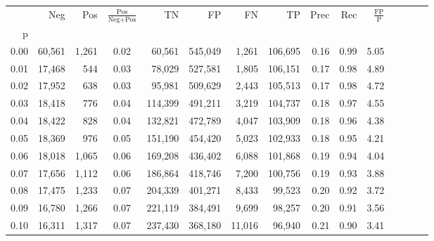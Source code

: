 \begin{tabular}{rrrcrrrrrrrrrrr}
\toprule
{} &     Neg &     Pos & $\frac{\text{Pos}}{\text{Neg}+\text{Pos}}$ &       TN &       FP &       FN &       TP &  Prec &   Rec & $\frac{\text{FP}}{\text{P}}$ \\
p    &         &         &                                            &          &          &          &          &       &       &                              \\
\midrule
0.00 &  60,561 &   1,261 &                                       0.02 &   60,561 &  545,049 &    1,261 &  106,695 &  0.16 &  0.99 &                         5.05 \\
0.01 &  17,468 &     544 &                                       0.03 &   78,029 &  527,581 &    1,805 &  106,151 &  0.17 &  0.98 &                         4.89 \\
0.02 &  17,952 &     638 &                                       0.03 &   95,981 &  509,629 &    2,443 &  105,513 &  0.17 &  0.98 &                         4.72 \\
0.03 &  18,418 &     776 &                                       0.04 &  114,399 &  491,211 &    3,219 &  104,737 &  0.18 &  0.97 &                         4.55 \\
0.04 &  18,422 &     828 &                                       0.04 &  132,821 &  472,789 &    4,047 &  103,909 &  0.18 &  0.96 &                         4.38 \\
0.05 &  18,369 &     976 &                                       0.05 &  151,190 &  454,420 &    5,023 &  102,933 &  0.18 &  0.95 &                         4.21 \\
0.06 &  18,018 &   1,065 &                                       0.06 &  169,208 &  436,402 &    6,088 &  101,868 &  0.19 &  0.94 &                         4.04 \\
0.07 &  17,656 &   1,112 &                                       0.06 &  186,864 &  418,746 &    7,200 &  100,756 &  0.19 &  0.93 &                         3.88 \\
0.08 &  17,475 &   1,233 &                                       0.07 &  204,339 &  401,271 &    8,433 &   99,523 &  0.20 &  0.92 &                         3.72 \\
0.09 &  16,780 &   1,266 &                                       0.07 &  221,119 &  384,491 &    9,699 &   98,257 &  0.20 &  0.91 &                         3.56 \\
0.10 &  16,311 &   1,317 &                                       0.07 &  237,430 &  368,180 &   11,016 &   96,940 &  0.21 &  0.90 &                         3.41 \\

\end{tabular}

